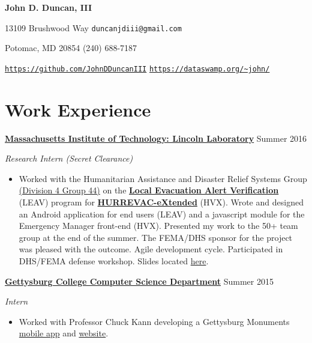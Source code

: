\documentclass[11pt]{article}
\begin{document}
\fancyfoot{}
\pagestyle{fancy}
\thispagestyle{empty}
\renewcommand{\headrulewidth}{0pt}
\begin{center}
	{\huge \textbf{John D. Duncan, III}}
\end{center}
13109 Brushwood Way
\hfill
\texttt{duncanjdiii@gmail.com}

Potomac, MD 20854
\hfill
(240) 688-7187

\texttt{\url{https://github.com/JohnDDuncanIII}}
\hfill
\texttt{\url{https://dataswamp.org/~john/}}

\section*{Work Experience}
\textbf{\href{http://www.ll.mit.edu/}{Massachusetts Institute of Technology: Lincoln Laboratory}}
\hfill
Summer 2016

\textit{Research Intern \small{(Secret Clearance)}}

\begin{itemize}
\item[] Worked with the Humanitarian Assistance and Disaster Relief Systems Group \href{https://www.ll.mit.edu/employment/division4.html#gp44}{(Division 4 Group 44)} on the \href{https://www.dhs.gov/publication/national-hurricane-program-technology-modernization-local-evacuation-alert-verification}{\textbf{Local Evacuation Alert Verification}} (LEAV) program for \href{https://www.dhs.gov/publication/national-hurricane-program-technology-modernization-hurrevac-extended-hv-x}{\textbf{HURREVAC-eXtended}} (HVX). Wrote and designed an Android application for end users (LEAV) and a javascript module for the Emergency Manager front-end (HVX). Presented my work to the 50+ team group at the end of the summer. The FEMA/DHS sponsor for the project was pleased with the outcome. Agile development cycle. Participated in DHS/FEMA defense workshop. Slides located \href{https://docs.google.com/presentation/d/1d6u7eK2fBJElrRpEn1KlkTfReKO_tHj5iCAGb6vgtmg/}{here}.\\
\end{itemize}

\textbf{\href{http://cs.gettysburg.edu/}{Gettysburg College Computer Science Department}}
\hfill
Summer 2015

\textit{Intern}

\begin{itemize}
\item[] Worked with Professor Chuck Kann developing a Gettysburg Monuments \href{https://play.google.com/store/apps/details?id=edu.gettysburg.MonumentsMap}{mobile app} and \href{http://historicgettysburg.us/MonumentsMap/Monuments.html}{website}.\\
\end{itemize}
\end{document}
